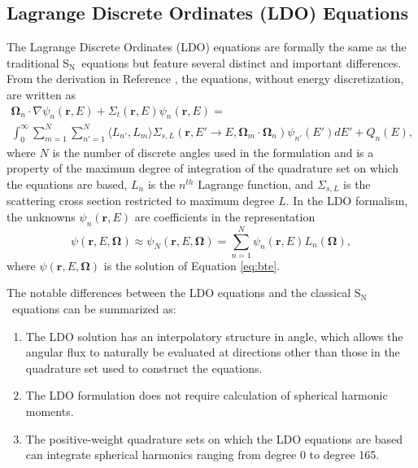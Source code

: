 \documentclass{article} %
\newcommand{\bo}{\mathbf\Omega}
\newcommand{\vecr}{\textbf{r}}
\newcommand{\sn}{S$_\mathrm{N}$}
\begin{document}
\subsection{Lagrange Discrete Ordinates (LDO) Equations}

The Lagrange Discrete Ordinates (LDO) equations are formally the same as the
traditional \sn\ equations but feature several distinct and important
differences. From the derivation in Reference \cite{ahrens}, the equations,
without energy discretization, are written as
%
\begin{multline}
\bo_n\cdot\nabla\psi_{n}(\vecr,E) + 
\Sigma_{t}(\vecr,E)\psi_{n}(\vecr,E) = \\
\int_0^\infty\sum_{m=1}^{N}\sum_{n'=1}^{N}\langle L_{n'},L_{m}\rangle
\Sigma_{s,L}(\vecr,E'\rightarrow E,\bo_{m}\cdot\bo_n)\psi_{n'}(E')dE'
+ Q_{n}(E),
\end{multline}
%
where $N$ is the number of discrete angles used in the formulation
and is a property of the maximum degree of integration of the quadrature set
on which the equations are based, $L_n$ is the $n^{th}$ Lagrange function, and
$\Sigma_{s,L}$ is the scattering cross section restricted to maximum degree
$L$. In the LDO formalism, the unknowns $\psi_{n}(\vecr,E)$ are coefficients in 
the representation
%
\begin{equation}
\psi(\vecr,E,\bo) \approx \psi_N(\vecr,E,\bo) =
\sum_{n=1}^{N}\psi_{n}(\vecr,E) L_n\left(\bo\right),
\end{equation}
%
where $\psi(\vecr,E,\bo)$ is the solution of Equation \eqref{eq:bte}.

The notable differences between the LDO equations and the classical \sn\
equations can be summarized as:

\begin{enumerate}
\item{The LDO solution has an interpolatory structure in angle, which allows
      the angular flux to naturally be evaluated at directions other than those
      in the quadrature set used to construct the equations.}
\item{The LDO formulation does not require calculation of spherical harmonic
      moments.}
\item{The positive-weight quadrature sets on which the LDO equations are based
      can integrate spherical harmonics ranging from degree 0 to degree 165.}
\end{enumerate}
\end{document}
